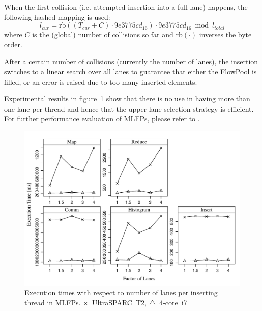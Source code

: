 \documentclass[runningheads,a4paper,fleqn]{llncs}
\begin{document}
When the first collision (i.e. attempted insertion into a full lane)
happens, the following hashed mapping is used:
\[ l_{cur} = \mathrm{rb}((T_{cur} + C) \cdot 9e3775cd_{16})
   \cdot 9e3775cd_{16}  \bmod l_{total} \]
where $C$ is the (global) number of collisions so far and
$\mathrm{rb}(\cdot)$ inverses the byte order.

After a certain number of collisions (currently the number of lanes),
the insertion switches to a linear search over all lanes to guarantee
that either the FlowPool is filled, or an error is raised due to too
many inserted elements.

Experimental results in figure~\ref{fig:lanef-scaling} show that there
is no use in having more than one lane per thread and hence that the
upper lane selection strategy is efficient. For further performance
evaluation of MLFPs, please refer to \cite{FP12}.

\begin{figure}[tbp]
  \includegraphics[width=\textwidth]{../../benchmarks/graphs/lanef-scaling}
  \caption{Execution times with respect to number of lanes per
    inserting thread in MLFPs. $\times$~UltraSPARC~T2,
    $\triangle$~4-core~i7}
  \label{fig:lanef-scaling}
\end{figure}
\end{document}
